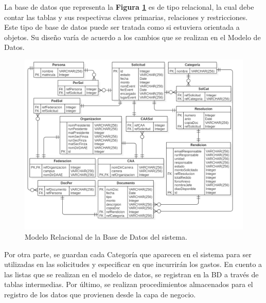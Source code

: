 La base de datos que representa la \textbf{Figura \ref{fig: Modelo_Relacional}} es de tipo relacional, la cual debe contar las tablas y sus respectivas claves primarias, relaciones y restricciones. Este tipo de base de datos puede ser tratada como si estuviera orientada a objetos. Su diseño varía de acuerdo a los cambios que se realizan en el Modelo de Datos. 

\begin{figure}[tb]
    \includegraphics[width=\textwidth]{Imagenes/Modelo_relacional_bd.png}
    \caption{\label{fig: Modelo_Relacional}Modelo Relacional de la Base de Datos del sistema.}
\end{figure}

Por otra parte, se guardan cada Categoría que aparecen en el sistema para ser utilizadas en las solicitudes y especificar en que incurrirán los gastos. En cuento a las listas que se realizan en el modelo de datos, se registran en la BD a través de tablas intermedias. Por último, se realizan procedimientos almacenados para el registro de los datos que provienen desde la capa de negocio. 

